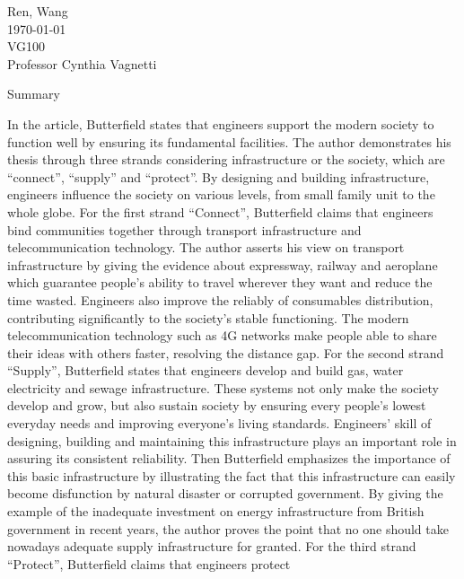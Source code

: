 \documentclass[12pt,a4]{article}
\begin{document}
\begin{flushleft}
Ren, Wang\\
\today\\
VG100\\
Professor Cynthia Vagnetti \\
\end{flushleft}

\begin{center}
Summary
\end{center}


In the article, Butterfield \cite{but} states that engineers support the modern
society to function well by ensuring its fundamental facilities. 
The author demonstrates his thesis through three strands considering
infrastructure or the society, which are ``connect'', ``supply'' and
``protect''. 
By designing and building infrastructure, engineers influence the society on
various levels, from small family unit to the whole globe.  
%
%
For the first strand ``Connect'', Butterfield claims that engineers bind
communities together through transport infrastructure and telecommunication
technology.
The author asserts his view on transport infrastructure by giving the evidence
about expressway, railway and aeroplane which guarantee people's ability to
travel wherever they want and reduce the time wasted. 
Engineers also improve the reliably of consumables distribution, contributing
significantly to the society's stable functioning. 
The modern telecommunication technology such as 4G networks make people able to
share their ideas with others faster, resolving the distance gap. 
%
%
For the second strand ``Supply'', Butterfield states that engineers develop and
build gas, water electricity and sewage infrastructure.
These systems not only make the society develop and grow, but also sustain
society by ensuring every people's lowest everyday needs and improving
everyone's living standards. 
Engineers' skill of designing, building and maintaining this infrastructure
plays an important role in assuring its consistent reliability.
Then Butterfield emphasizes the importance of this basic infrastructure by
illustrating the fact that this infrastructure can easily become disfunction by
natural disaster or corrupted government.
By giving the example of the inadequate investment on energy infrastructure from
British government in recent years, the author proves the point that no one
should take nowadays adequate supply infrastructure for granted. 
%
%
For the third strand ``Protect'', Butterfield claims that engineers protect
\end{document}
